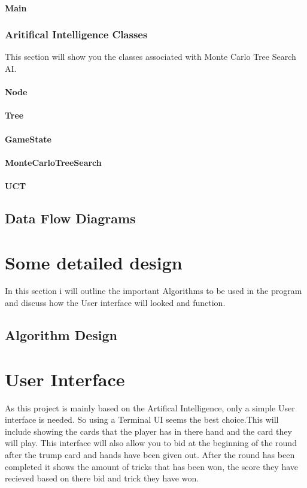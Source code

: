 \paragraph{Main}
\subsubsection{Aritifical Intelligence Classes}
This section will show you the classes associated with Monte Carlo Tree Search AI. 
\paragraph{Node}

\paragraph{Tree}
\paragraph{GameState}
\paragraph{MonteCarloTreeSearch}
\paragraph{UCT}

\subsection{Data Flow Diagrams}
\section{Some detailed design}
In this section i will outline the important Algorithms to be used in the program and discuss how the User interface will looked and function.
\subsection{Algorithm Design}
\section{User Interface}
As this project is mainly based on the Artifical Intelligence, only a simple User interface is needed. So using a Terminal UI seems the best choice.This will include showing the cards that the player has in there hand and the card they will play. This interface will also allow you to bid at the beginning of the round after the trump card and hands have been given out. After the round has been completed it shows the amount of tricks that has been won, the score they have recieved based on there bid and trick they have won.
